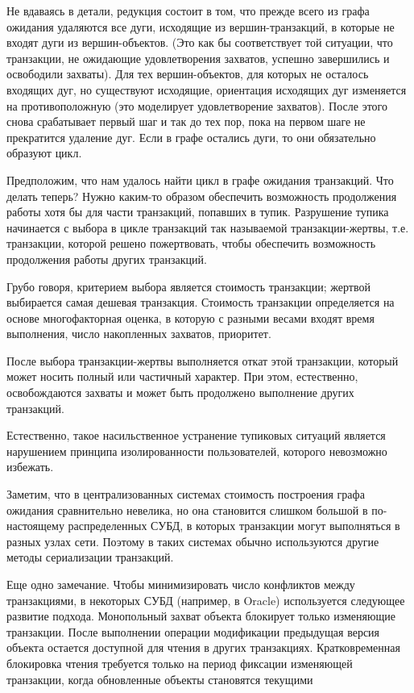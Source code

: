 Не вдаваясь в детали, редукция состоит в том, что прежде всего из графа ожидания удаляются все дуги, исходящие из вершин-транзакций, в которые не входят дуги из вершин-объектов. (Это как бы соответствует той ситуации, что транзакции, не ожидающие удовлетворения захватов, успешно завершились и освободили захваты). Для тех вершин-объектов, для которых не осталось входящих дуг, но существуют исходящие, ориентация исходящих дуг изменяется на противоположную (это моделирует удовлетворение захватов). После этого снова срабатывает первый шаг и так до тех пор, пока на первом шаге не прекратится удаление дуг. Если в графе остались дуги, то они обязательно образуют цикл.

Предположим, что нам удалось найти цикл в графе ожидания транзакций. Что делать теперь? Нужно каким-то образом обеспечить возможность продолжения работы хотя бы для части транзакций, попавших в тупик. Разрушение тупика начинается с выбора в цикле транзакций так называемой транзакции-жертвы, т.е. транзакции, которой решено пожертвовать, чтобы обеспечить возможность продолжения работы других транзакций.

Грубо говоря, критерием выбора является стоимость транзакции; жертвой выбирается самая дешевая транзакция. Стоимость транзакции определяется на основе многофакторная оценка, в которую с разными весами входят время выполнения, число накопленных захватов, приоритет.

После выбора транзакции-жертвы выполняется откат этой транзакции, который может носить полный или частичный характер. При этом, естественно, освобождаются захваты и может быть продолжено выполнение других транзакций.

Естественно, такое насильственное устранение тупиковых ситуаций является нарушением принципа изолированности пользователей, которого невозможно избежать.

Заметим, что в централизованных системах стоимость построения графа ожидания сравнительно невелика, но она становится слишком большой в по-настоящему распределенных СУБД, в которых транзакции могут выполняться в разных узлах сети. Поэтому в таких системах обычно используются другие методы сериализации транзакций.

Еще одно замечание. Чтобы минимизировать число конфликтов между транзакциями, в некоторых СУБД (например, в Oracle) используется следующее развитие подхода. Монопольный захват объекта блокирует только изменяющие транзакции. После выполнении операции модификации предыдущая версия объекта остается доступной для чтения в других транзакциях. Кратковременная блокировка чтения требуется только на период фиксации изменяющей транзакции, когда обновленные объекты становятся текущими \autocite{Serial}
